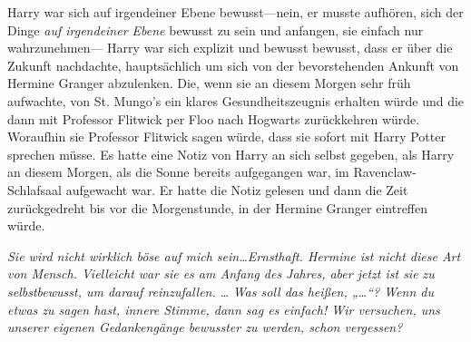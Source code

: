 Harry war sich auf irgendeiner Ebene bewusst—nein, er musste aufhören, sich der Dinge \emph{auf irgendeiner Ebene} bewusst zu sein und anfangen, sie einfach nur wahrzunehmen— Harry war sich explizit und bewusst bewusst, dass er über die Zukunft nachdachte, hauptsächlich um sich von der bevorstehenden Ankunft von Hermine Granger abzulenken. Die, wenn sie an diesem Morgen sehr früh aufwachte, von St. Mungo’s ein klares Gesundheitszeugnis erhalten würde und die dann mit Professor Flitwick per Floo nach Hogwarts zurückkehren würde. Woraufhin sie Professor Flitwick sagen würde, dass sie sofort mit Harry Potter sprechen müsse. Es hatte eine Notiz von Harry an sich selbst gegeben, als Harry an diesem Morgen, als die Sonne bereits aufgegangen war, im Ravenclaw-Schlafsaal aufgewacht war. Er hatte die Notiz gelesen und dann die Zeit zurückgedreht bis vor die Morgenstunde, in der Hermine Granger eintreffen würde.

\emph{Sie wird nicht wirklich böse auf mich sein…Ernsthaft. Hermine ist nicht diese Art von Mensch. Vielleicht war sie es am Anfang des Jahres, aber jetzt ist sie zu selbstbewusst, um darauf reinzufallen.}
\emph{…}
\emph{Was soll das heißen, „…“? Wenn du etwas zu sagen hast, innere Stimme, dann sag es einfach! Wir versuchen, uns unserer eigenen Gedankengänge bewusster zu werden, schon vergessen?}

\later

